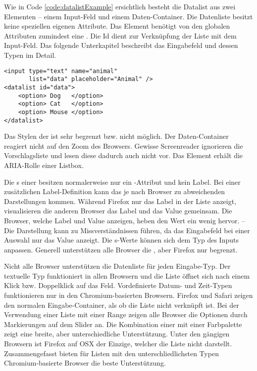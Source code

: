 Wie in Code \ref{code:datalistExample} ersichtlich besteht die Datalist aus zwei Elementen – einem Input-Feld und einem Daten-Container. 
Die Datenliste besitzt keine speziellen eigenen Attribute.
Das Element benötigt von den globalen Attributen zumindest eine .
Die Id dient zur Verknüpfung der Liste mit dem Input-Feld. 
Das folgende Unterkapitel \textbf{} beschreibt das Eingabefeld und dessen Typen im Detail.

\begin{lstlisting}[style = htmlcssjs, caption = Datalist Beispiel, label = code:datalistExample]
<input type="text" name="animal" 
       list="data" placeholder="Animal" />
<datalist id="data">
    <option> Dog   </option>
    <option> Cat   </option>
    <option> Mouse </option>
</datalist>
\end{lstlisting}

Das Stylen der  ist sehr begrenzt bzw. nicht möglich. 
Der Daten-Container reagiert nicht auf den Zoom des Browsers.
Gewisse Screenreader ignorieren die Vorschlagsliste und lesen diese dadurch auch nicht vor.
Das Element erhält die ARIA-Rolle einer Listbox.

Die s einer  besitzen normalerweise nur ein -Attribut und kein Label.
Bei einer zusätzlichen Label-Definition kann das je nach Browser zu abweichenden Darstellungen kommen. 
Während Firefox nur das Label in der Liste anzeigt, visualisieren die anderen Browser das Label und das Value gemeinsam.
Die Browser, welche Label und Value anzeigen, heben den Wert ein wenig hervor.
--
Die Darstellung kann zu Missverständnissen führen, da das Eingabefeld bei einer Auswahl nur das Value anzeigt. 
Die s-Werte können sich dem Typ des Inputs anpassen. 
Generell unterstützen alle Browser die , aber Firefox nur begrenzt.

Nicht alle Browser unterstützen die Datenliste für jeden Eingabe-Typ.
Der textuelle Typ funktioniert in allen Browsern und die Liste öffnet sich nach einem Klick bzw. Doppelklick auf das Feld.
Vordefinierte Datum- und Zeit-Typen funktionieren nur in den Chromium-basierten Browsern. 
Firefox und Safari zeigen den normalen Eingabe-Container, als ob die Liste nicht verknüpft ist.
Bei der Verwendung einer Liste mit einer Range zeigen alle Browser die Optionen durch Markierungen auf dem Slider an.
Die Kombination einer  mit einer Farbpalette zeigt eine breite, aber unterschiedliche Unterstützung. 
Unter den gängigen Browsern ist Firefox auf OSX der Einzige, welcher die Liste nicht darstellt.
Zusammengefasst bieten für Listen mit den unterschliedlichsten Typen Chromium-basierte Browser die beste Unterstützung.


